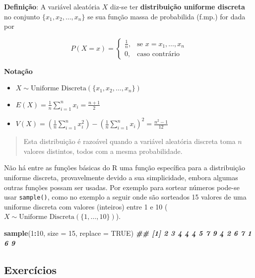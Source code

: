 \documentclass[
]{book}
\newenvironment{Shaded}{\begin{snugshade}}{\end{snugshade}}
\newcommand{\AttributeTok}[1]{\textcolor[rgb]{0.13,0.29,0.53}{#1}}
\newcommand{\ConstantTok}[1]{\textcolor[rgb]{0.56,0.35,0.01}{#1}}
\newcommand{\DecValTok}[1]{\textcolor[rgb]{0.00,0.00,0.81}{#1}}
\newcommand{\DocumentationTok}[1]{\textcolor[rgb]{0.56,0.35,0.01}{\textbf{\textit{#1}}}}
\newcommand{\FunctionTok}[1]{\textcolor[rgb]{0.13,0.29,0.53}{\textbf{#1}}}
\newcommand{\NormalTok}[1]{#1}
\newcommand{\SpecialCharTok}[1]{\textcolor[rgb]{0.81,0.36,0.00}{\textbf{#1}}}
\providecommand{\tightlist}{%
  \setlength{\itemsep}{0pt}\setlength{\parskip}{0pt}}
\begin{document}
\textbf{Definição}: A variável aleatória \(X\) diz-se ter \textbf{distribuição uniforme discreta} no conjunto \(\{x_1, x_2, \dots, x_n\}\) se sua função massa de probabilida (f.mp.) for dada por

\[
P(X = x) = 
\begin{cases}
\frac{1}{n}, & \text{se } x = x_1, \dots, x_n \\
0, & \text{caso contrário}
\end{cases}
\]

\textbf{Notação}

\begin{itemize}
\tightlist
\item
  \(X \sim \text{Uniforme Discreta} (\{x_1, x_2, \dots, x_n\})\)
\item
  \(E(X) = \frac{1}{n} \sum_{i=1}^{n} x_i = \frac{n+1}{2}\)
\item
  \(V(X) = \left(\frac{1}{n} \sum_{i=1}^{n} x_i^2\right) - \left(\frac{1}{n} \sum_{i=1}^{n} x_i \right)^2 = \frac{n^2 - 1}{12}\)
\end{itemize}

\begin{quote}
Esta distribuição é razoável quando a variável aleatória discreta toma \(n\) valores distintos, todos com a mesma probabilidade.
\end{quote}

Não há entre as funções básicas do R uma função específica para a distribuição uniforme discreta, provavelmente devido a sua simplicidade, embora algumas outras funções possam ser usadas. Por exemplo para sortear números pode-se usar \texttt{sample()}, como no exemplo a seguir onde são sorteados 15 valores de uma uniforme discreta com valores (inteiros) entre 1 e 10 (\(X\sim \text{Uniforme Discreta}(\{1,\ldots,10\})\)).

\begin{Shaded}
\begin{Highlighting}[]
\FunctionTok{sample}\NormalTok{(}\DecValTok{1}\SpecialCharTok{:}\DecValTok{10}\NormalTok{, }\AttributeTok{size =} \DecValTok{15}\NormalTok{, }\AttributeTok{replace =} \ConstantTok{TRUE}\NormalTok{)}
\DocumentationTok{\#\# [1] 2 3 4 4 4 5 7 9 4 2 6 7 1 6 9}
\end{Highlighting}
\end{Shaded}

\subsection{Exercícios}\label{exercuxedcios-24}
\end{document}

